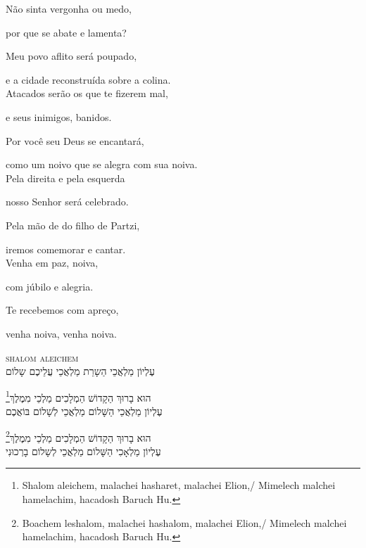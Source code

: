 \movetooddpage
\raggedright %

\vspace*{1cm}



Não sinta vergonha ou medo,

por que se abate e lamenta?

Meu povo aflito será poupado,

e a cidade reconstruída sobre a colina.\\[10pt]

Atacados serão os que te fizerem mal,

e seus inimigos, banidos.

Por você seu Deus se encantará,

como um noivo que se alegra com sua noiva.\\[10pt]

Pela direita e pela esquerda

nosso Senhor será celebrado.

Pela mão de do filho de Partzi,

iremos comemorar e cantar.\\[10pt]

Venha em paz, noiva,

com júbilo e alegria.

Te recebemos com apreço,

venha noiva, venha noiva.


\movetoevenpage
\raggedleft
{}

\vspace*{1cm}

\textsc{shalom aleichem}\\[15pt]

עֶלְיוֹן מַלְאֲכֵי הַשָרֵת מַלְאֲכֵי עֲלֵיכֶם שָלוֹם

\footnote{Shalom aleichem, malachei hasharet, malachei Elion,/ Mimelech malchei hamelachim, hacadosh Baruch Hu.}הוּא בָרוּךְ הַקָדוֹשׁ הַמְלָכִים מַלְכֵי מִמֶלֶךְ\\[10pt]

עֶלְיוֹן מַלְאֲכֵי הַשָּׁלוֹם מַלְאֲכֵי לְשָׁלוֹם בּוֹאֲכֶם

\footnote{Boachem leshalom, malachei hashalom, malachei Elion,/ Mimelech malchei hamelachim, hacadosh Baruch Hu.}הוּא בָרוּךְ הַקָדוֹשׁ הַמְלָכִים מַלְכֵי מִמֶלֶךְ\\[10pt]

עֶלְיוֹן מַלְאָכִי הַשָּׁלוֹם מַלְאֲכֵי לְשָלוֹם בָרְכוּנִי

